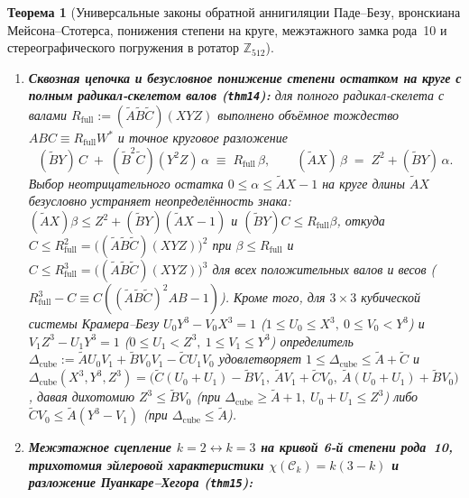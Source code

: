 \documentclass[11pt,a4paper]{article}
\theoremstyle{plain}
\newtheorem{theorem}{Теорема}[section]
\theoremstyle{definition}
\begin{document}
\begin{theorem}[Универсальные законы обратной аннигиляции Паде--Безу, вронскиана Мейсона--Стотерса, понижения степени на круге, межэтажного замка рода~10 и стереографического погружения в ротатор $\mathbb{Z}_{512}$]
\begin{enumerate}[label=\textbf{(\roman*)},leftmargin=*]
  \begin{equation}
    \label{eq:ms-wronskian}
    W^* \;:=\; A B^* - B A^* \;\equiv\; X^2 Y^2 Z^2,\qquad
    -\det\mathcal{W}_{\mathrm{MS}} \;\equiv\; X^4 + Y^4 + Z^4,
  \end{equation}
  и двусторонним схождением Крамера $w X^2 + \widetilde{B}\gamma = D_{\mathrm{clash}}Z$, $v X^2 + \widetilde{C}\beta = D_{\mathrm{clash}}Y$ ($D_{\mathrm{clash}} = \widetilde{C}w\beta - \widetilde{B}v\gamma$).
\item \textbf{Сквозная цепочка и безусловное понижение степени остатком на круге с полным радикал-скелетом валов (\texttt{thm14}):}
  для полного радикал-скелета с валами $R_{\mathrm{full}} := (\widetilde{A}\widetilde{B}\widetilde{C})(X Y Z)$ выполнено объёмное тождество $A B C \equiv R_{\mathrm{full}} W^*$ и точное круговое разложение
  \begin{equation}
    \label{eq:circle-remainder-rfull}
    (\widetilde{B}Y)\,C \;+\; (\widetilde{B}^2\widetilde{C})(Y^2 Z)\,\alpha \;\equiv\; R_{\mathrm{full}}\,\beta,\qquad
    (\widetilde{A}X)\,\beta \;=\; Z^2 + (\widetilde{B}Y)\,\alpha.
  \end{equation}
  Выбор неотрицательного остатка $0\le\alpha\le\widetilde{A}X-1$ на круге длины $\widetilde{A}X$ безусловно устраняет неопределённость знака: $(\widetilde{A}X)\beta \le Z^2 + (\widetilde{B}Y)(\widetilde{A}X-1)$ и $(\widetilde{B}Y)C \le R_{\mathrm{full}}\beta$, откуда $C \le R_{\mathrm{full}}^2 = \bigl((\widetilde{A}\widetilde{B}\widetilde{C})(X Y Z)\bigr)^2$ при $\beta\le R_{\mathrm{full}}$ и $C \le R_{\mathrm{full}}^3 = \bigl((\widetilde{A}\widetilde{B}\widetilde{C})(X Y Z)\bigr)^3$ для всех положительных валов и весов ($R_{\mathrm{full}}^3 - C \equiv C((\widetilde{A}\widetilde{B}\widetilde{C})^2 A B - 1)$). Кроме того, для $3\times 3$ кубической системы Крамера--Безу $U_0 Y^3 - V_0 X^3 = 1$ ($1\le U_0\le X^3,\ 0\le V_0 < Y^3$) и $V_1 Z^3 - U_1 Y^3 = 1$ ($0\le U_1 < Z^3,\ 1\le V_1\le Y^3$) определитель $\Delta_{\mathrm{cube}} := \widetilde{A}U_0 V_1 + \widetilde{B}V_0 V_1 - \widetilde{C}U_1 V_0$ удовлетворяет $1 \le \Delta_{\mathrm{cube}} \le \widetilde{A} + \widetilde{C}$ и $\Delta_{\mathrm{cube}}(X^3, Y^3, Z^3) = \bigl(\widetilde{C}(U_0+U_1)-\widetilde{B}V_1,\ \widetilde{A}V_1+\widetilde{C}V_0,\ \widetilde{A}(U_0+U_1)+\widetilde{B}V_0\bigr)$, давая дихотомию $Z^3 \le \widetilde{B}V_0$ (при $\Delta_{\mathrm{cube}}\ge\widetilde{A}+1,\ U_0+U_1\le Z^3$) либо $\widetilde{C}V_0 \le \widetilde{A}(Y^3-V_1)$ (при $\Delta_{\mathrm{cube}}\le\widetilde{A}$).
\item \textbf{Межэтажное сцепление $k=2 \leftrightarrow k=3$ на кривой 6-й степени рода~10, трихотомия эйлеровой характеристики $\chi(\mathcal{C}_k) = k(3-k)$ и разложение Пуанкаре--Хегора (\texttt{thm15}):}

\end{enumerate}
\end{theorem}
\end{document}
